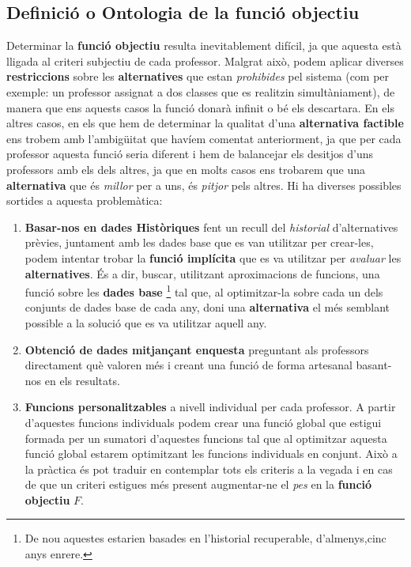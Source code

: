 \documentclass[10pt,twocolumn]{article}
\begin{document}
\subsection{Definició o Ontologia de la funció objectiu}
Determinar la \textbf{funció objectiu} resulta inevitablement difícil, ja que aquesta està lligada al criteri subjectiu de cada professor. Malgrat això, podem aplicar diverses \textbf{restriccions} sobre les  \textbf{alternatives} que estan \textit{prohibides} pel sistema (com per exemple: un professor assignat a dos classes que es realitzin simultàniament), de manera que ens aquests casos la funció donarà infinit o bé els descartara. En els altres casos, en els que hem de determinar la qualitat d'una \textbf{alternativa factible} ens trobem amb l'ambigüitat que havíem comentat anteriorment, ja que per cada professor aquesta funció seria diferent i hem de balancejar els desitjos d'uns professors amb els dels altres, ja que en molts casos ens trobarem que una \textbf{alternativa} que és \textit{millor} per a uns, és \textit{pitjor} pels altres. Hi ha diverses possibles sortides a aquesta problemàtica:
\begin{enumerate}
	\item \textbf{Basar-nos en dades Històriques} fent un recull del \textit{historial}  d'alternatives prèvies, juntament amb les dades base que es van utilitzar per crear-les, podem intentar trobar la \textbf{funció implícita} que es va utilitzar per \textit{avaluar} les \textbf{alternatives}. És a dir, buscar, utilitzant aproximacions de funcions, una funció sobre les \textbf{dades base} \footnote{De nou aquestes estarien basades en l'historial recuperable, d'almenys,cinc anys enrere.} tal que, al optimitzar-la sobre cada un dels conjunts de dades base de cada any, doni una \textbf{alternativa} el més semblant possible a la solució que es va utilitzar aquell any. 
	\item \textbf{Obtenció de dades mitjançant enquesta} preguntant als professors directament què valoren més i creant una funció de forma artesanal basant-nos en els resultats.
	\item \textbf{Funcions personalitzables} a nivell individual per cada professor. A partir d'aquestes funcions individuals podem crear una funció global que estigui formada per un sumatori d'aquestes funcions tal que al optimitzar aquesta funció global estarem optimitzant les funcions individuals en conjunt. Això a la pràctica és pot traduir en contemplar tots els criteris a la vegada i en cas de que un criteri estigues més present augmentar-ne el \textit{pes} en la \textbf{funció objectiu} $F$.
\end{enumerate} 
\end{document}
